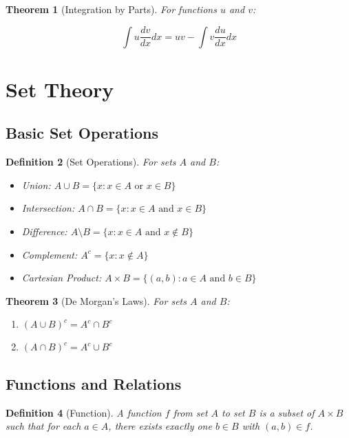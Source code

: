 \documentclass[12pt]{article}
\newif\ifDarkMode
\newcommand{\eqcolor}[1]{\ifDarkMode\textcolor{draculaPurple}{#1}\else#1\fi}
\newcommand{\varcolor}[1]{\ifDarkMode\textcolor{draculaGreen}{#1}\else#1\fi}
\newtheorem{theorem}{Theorem}[section]
\newtheorem{definition}[theorem]{Definition}
\begin{document}
\begin{theorem}[Integration by Parts]
For functions $\varcolor{u}$ and $\varcolor{v}$:

\[
\eqcolor{\int u \frac{dv}{dx} dx = uv - \int v \frac{du}{dx} dx}
\]
\end{theorem}

\section{\textcolor{draculaCyan}{Set Theory}}

\subsection{\textcolor{draculaYellow}{Basic Set Operations}}

\begin{definition}[Set Operations]
For sets $\varcolor{A}$ and $\varcolor{B}$:
\begin{itemize}
    \item Union: $\eqcolor{A \cup B = \{x : x \in A \text{ or } x \in B\}}$
    \item Intersection: $\eqcolor{A \cap B = \{x : x \in A \text{ and } x \in B\}}$
    \item Difference: $\eqcolor{A \setminus B = \{x : x \in A \text{ and } x \notin B\}}$
    \item Complement: $\eqcolor{A^c = \{x : x \notin A\}}$
    \item Cartesian Product: $\eqcolor{A \times B = \{(a, b) : a \in A \text{ and } b \in B\}}$
\end{itemize}
\end{definition}

\begin{theorem}[De Morgan's Laws]
For sets $\varcolor{A}$ and $\varcolor{B}$:
\begin{enumerate}
    \item $\eqcolor{(A \cup B)^c = A^c \cap B^c}$
    \item $\eqcolor{(A \cap B)^c = A^c \cup B^c}$
\end{enumerate}
\end{theorem}

\subsection{\textcolor{draculaYellow}{Functions and Relations}}

\begin{definition}[Function]
A function $\varcolor{f}$ from set $\varcolor{A}$ to set $\varcolor{B}$ is a subset of $\varcolor{A \times B}$ such that for each $\varcolor{a \in A}$, there exists exactly one $\varcolor{b \in B}$ with $\varcolor{(a, b) \in f}$.
\end{definition}
\end{document}
